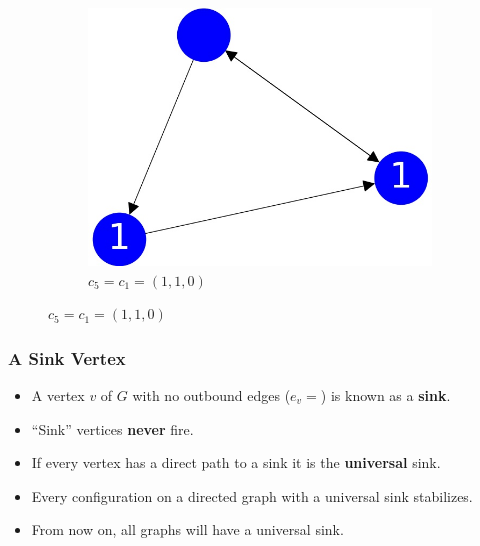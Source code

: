 \documentclass{beamer}
\begin{document}
\begin{frame}
\begin{figure}[h!]
\begin{subfigure}[b]{0.3\linewidth}
    \includegraphics[width=\linewidth]{sandpile_simple_1}
    \caption{$c_5 = c_{1} = (1,1,0)$}
  \end{subfigure}

\end{figure}

\end{frame}




\begin{frame}
\frametitle{A Sink Vertex}
  \begin{itemize}
    \item A vertex $v$ of $G$ with no outbound edges ($e_v = {}$) is known as a \textbf{sink}.
    \item ``Sink'' vertices \textbf{never} fire.
    \item If every vertex has a direct path to a sink it is the \textbf{universal} sink.
    \item Every configuration on a directed graph with a universal sink stabilizes.
    \item From now on, all graphs will have a universal sink.
  \end{itemize}
\end{frame}
\end{document}
